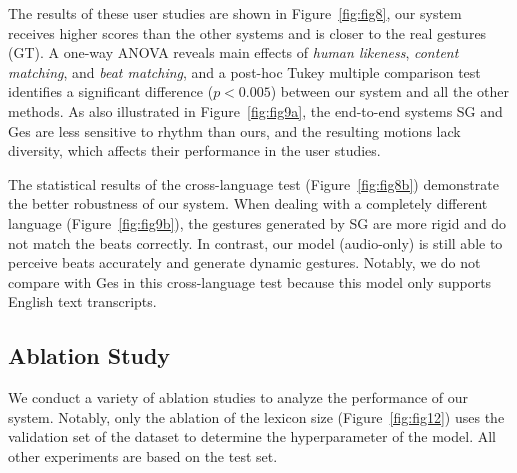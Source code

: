\documentclass[acmtog,authorversion]{acmart}
\newcommand{\fig}{Figure{}~}
\begin{document}
The results of these user studies are shown in \fig\ref{fig:fig8}, our system receives higher scores than the other systems and is closer to the real gestures (GT). A one-way ANOVA reveals main effects of \emph{human likeness}, \emph{content matching}, and \emph{beat matching}, and a post-hoc Tukey multiple comparison test identifies a significant difference ($p < 0.005$) between our system and all the other methods. 
As also illustrated in \fig\ref{fig:fig9a}, the end-to-end systems SG and Ges are less sensitive to rhythm than ours, and the resulting motions lack diversity, which affects their performance in the user studies.

The statistical results of the cross-language test (\fig\ref{fig:fig8b}) demonstrate the better robustness of our system. When dealing with a completely different language (\fig\ref{fig:fig9b}), the gestures generated by SG are more rigid and do not match the beats correctly. In contrast, our model (audio-only) is still able to perceive beats accurately and generate dynamic gestures. Notably, we do not compare with Ges in this cross-language test because this model only supports English text transcripts. 

\subsection{Ablation Study}
\label{subsec:ablation_study}
We conduct a variety of ablation studies to analyze the performance of our system. Notably, only the ablation of the lexicon size (\fig\ref{fig:fig12}) uses the validation set of the dataset to determine the hyperparameter of the model. All other experiments are based on the test set.
\end{document}
